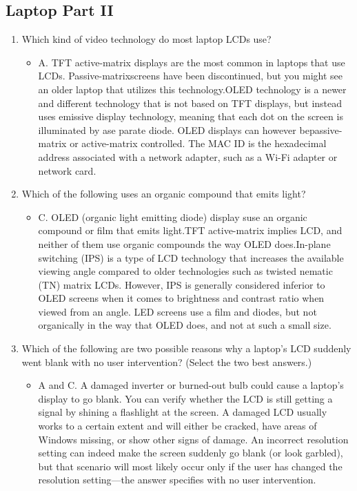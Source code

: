 \documentclass{article}
\begin{document}
\subsection{Laptop Part II} 
\begin{enumerate}
    \item Which kind of video technology do most laptop LCDs use?
    \begin{itemize}
        \item A. TFT active-matrix displays are the most common in laptops that use LCDs. Passive-matrixscreens have been discontinued, but you might see an older laptop that utilizes this technology.OLED technology is a newer and different technology that is not based on TFT displays, but instead uses emissive display technology, meaning that each dot on the screen is illuminated by ase parate diode. OLED displays can however bepassive-matrix or active-matrix controlled. The MAC ID is the hexadecimal address associated with a network adapter, such as a Wi-Fi adapter or network card.
    \end{itemize}
    \item Which of the following uses an organic compound that emits light?
    \begin{itemize}
        \item C. OLED (organic light emitting diode) display suse an organic compound or film that emits light.TFT active-matrix implies LCD, and neither of them use organic compounds the way OLED does.In-plane switching (IPS) is a type of LCD technology that increases the available viewing angle compared to older technologies such as twisted nematic (TN) matrix LCDs. However, IPS is generally considered inferior to OLED screens when it comes to brightness and contrast ratio when viewed from an angle. LED screens use a film and diodes, but not organically in the way that OLED does, and not at such a small size.
    \end{itemize}
    \item Which of the following are two possible reasons why a laptop’s LCD suddenly went blank with no user intervention? (Select the two best answers.)
    \begin{itemize}
        \item  A and C. A damaged inverter or burned-out bulb could cause a laptop’s display to go blank. You can verify whether the LCD is still getting a signal by shining a flashlight at the screen. A damaged LCD usually works to a certain extent and will either be cracked, have areas of Windows missing, or show other signs of damage. An incorrect resolution setting can indeed make the screen suddenly go blank (or look garbled), but that scenario will most likely occur only if the user has changed the resolution setting—the answer specifies with no user intervention.

\end{itemize}
\end{enumerate}
\end{document}
